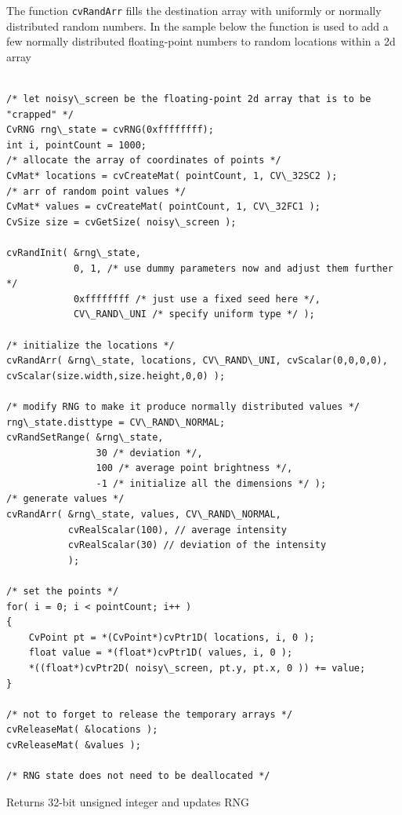 The function \texttt{cvRandArr} fills the destination array with uniformly
or normally distributed random numbers. In the sample below the function
is used to add a few normally distributed floating-point numbers to
random locations within a 2d array

\begin{lstlisting}

/* let noisy\_screen be the floating-point 2d array that is to be "crapped" */
CvRNG rng\_state = cvRNG(0xffffffff);
int i, pointCount = 1000;
/* allocate the array of coordinates of points */
CvMat* locations = cvCreateMat( pointCount, 1, CV\_32SC2 );
/* arr of random point values */
CvMat* values = cvCreateMat( pointCount, 1, CV\_32FC1 );
CvSize size = cvGetSize( noisy\_screen );

cvRandInit( &rng\_state,
            0, 1, /* use dummy parameters now and adjust them further */
            0xffffffff /* just use a fixed seed here */,
            CV\_RAND\_UNI /* specify uniform type */ );

/* initialize the locations */
cvRandArr( &rng\_state, locations, CV\_RAND\_UNI, cvScalar(0,0,0,0), cvScalar(size.width,size.height,0,0) );

/* modify RNG to make it produce normally distributed values */
rng\_state.disttype = CV\_RAND\_NORMAL;
cvRandSetRange( &rng\_state,
                30 /* deviation */,
                100 /* average point brightness */,
                -1 /* initialize all the dimensions */ );
/* generate values */
cvRandArr( &rng\_state, values, CV\_RAND\_NORMAL,
           cvRealScalar(100), // average intensity
           cvRealScalar(30) // deviation of the intensity
           );

/* set the points */
for( i = 0; i < pointCount; i++ )
{
    CvPoint pt = *(CvPoint*)cvPtr1D( locations, i, 0 );
    float value = *(float*)cvPtr1D( values, i, 0 );
    *((float*)cvPtr2D( noisy\_screen, pt.y, pt.x, 0 )) += value;
}

/* not to forget to release the temporary arrays */
cvReleaseMat( &locations );
cvReleaseMat( &values );

/* RNG state does not need to be deallocated */

\end{lstlisting}

\label{RandInt}

Returns 32-bit unsigned integer and updates RNG


